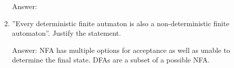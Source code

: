 \documentclass[12pt]{article}
\begin{document}
\begin{enumerate}
   \begin{center}
   	   Answer: 
   \end{center}
   \item  ”Every deterministic finite autmaton is also a non-deterministic finite automaton”. Justify the statement.
   \begin{center}
   	    Answer: NFA has multiple options for acceptance as well as unable to determine the final state. DFAs are a subset of a possible NFA.
   \end{center}
\end{enumerate}
\end{document}
